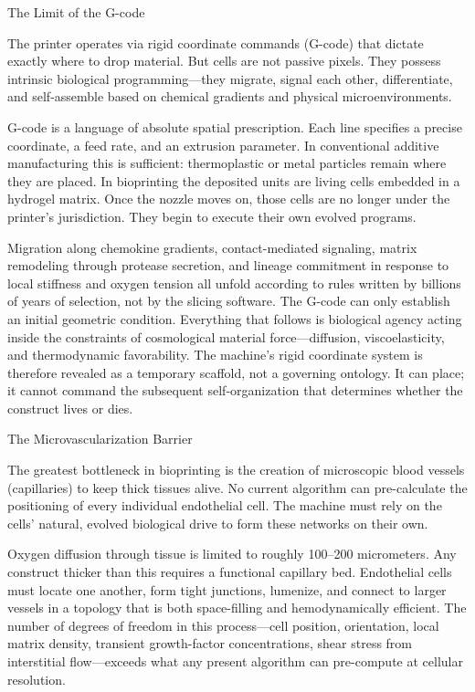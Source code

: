 The Limit of the G-code

The printer operates via rigid coordinate commands (G-code) that dictate exactly where to drop material. But cells are not passive pixels. They possess intrinsic biological programming—they migrate, signal each other, differentiate, and self-assemble based on chemical gradients and physical microenvironments.

G-code is a language of absolute spatial prescription. Each line specifies a precise coordinate, a feed rate, and an extrusion parameter. In conventional additive manufacturing this is sufficient: thermoplastic or metal particles remain where they are placed. In bioprinting the deposited units are living cells embedded in a hydrogel matrix. Once the nozzle moves on, those cells are no longer under the printer’s jurisdiction. They begin to execute their own evolved programs.

Migration along chemokine gradients, contact-mediated signaling, matrix remodeling through protease secretion, and lineage commitment in response to local stiffness and oxygen tension all unfold according to rules written by billions of years of selection, not by the slicing software. The G-code can only establish an initial geometric condition. Everything that follows is biological agency acting inside the constraints of cosmological material force—diffusion, viscoelasticity, and thermodynamic favorability. The machine’s rigid coordinate system is therefore revealed as a temporary scaffold, not a governing ontology. It can place; it cannot command the subsequent self-organization that determines whether the construct lives or dies.

The Microvascularization Barrier

The greatest bottleneck in bioprinting is the creation of microscopic blood vessels (capillaries) to keep thick tissues alive. No current algorithm can pre-calculate the positioning of every individual endothelial cell. The machine must rely on the cells’ natural, evolved biological drive to form these networks on their own.

Oxygen diffusion through tissue is limited to roughly 100–200 micrometers. Any construct thicker than this requires a functional capillary bed. Endothelial cells must locate one another, form tight junctions, lumenize, and connect to larger vessels in a topology that is both space-filling and hemodynamically efficient. The number of degrees of freedom in this process—cell position, orientation, local matrix density, transient growth-factor concentrations, shear stress from interstitial flow—exceeds what any present algorithm can pre-compute at cellular resolution.

